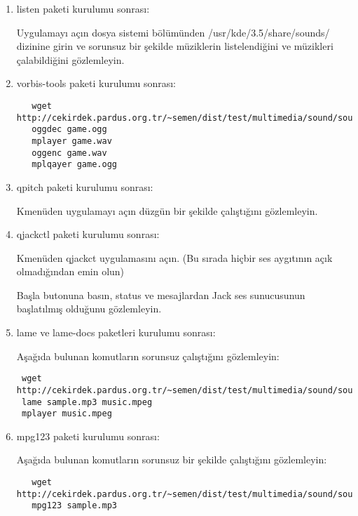 \documentclass[a4paper,10pt]{article}
\begin{document}
\begin{enumerate}
\item listen paketi kurulumu sonrası: 

Uygulamayı açın dosya sistemi bölümünden /usr/kde/3.5/share/sounds/ dizinine girin ve sorunsuz bir şekilde müziklerin listelendiğini ve müzikleri çalabildiğini gözlemleyin.

\item vorbis-tools paketi kurulumu sonrası: 
 \begin{verbatim}
   wget http://cekirdek.pardus.org.tr/~semen/dist/test/multimedia/sound/sound/sample.ogg
   oggdec game.ogg
   mplayer game.wav
   oggenc game.wav
   mplqayer game.ogg
 \end{verbatim}

\item qpitch paketi kurulumu sonrası:

Kmenüden uygulamayı açın düzgün bir şekilde çalıştığını gözlemleyin.

\item qjackctl paketi kurulumu sonrası: 

Kmenüden qjackct uygulamasını açın. (Bu sırada hiçbir ses aygıtının açık olmadığından emin olun)

Başla butonuna basın, status ve mesajlardan Jack ses sunucusunun başlatılmış olduğunu gözlemleyin.

\item lame ve lame-docs paketleri kurulumu sonrası: 

Aşağıda bulunan komutların sorunsuz çalıştığını gözlemleyin:
\begin{verbatim}
 wget http://cekirdek.pardus.org.tr/~semen/dist/test/multimedia/sound/sound/sample.mp3
 lame sample.mp3 music.mpeg
 mplayer music.mpeg
\end{verbatim}

\item mpg123 paketi kurulumu sonrası:

Aşağıda bulunan komutların sorunsuz bir şekilde çalıştığını gözlemleyin:
 \begin{verbatim}
   wget http://cekirdek.pardus.org.tr/~semen/dist/test/multimedia/sound/sound/sample.mp3
   mpg123 sample.mp3
 \end{verbatim}

\end{enumerate}
\end{document}
